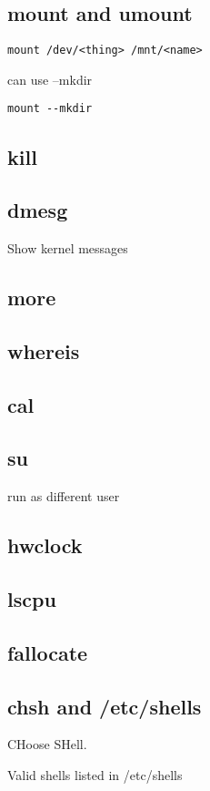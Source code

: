 
\subsection{mount and umount}

\begin{verbatim}
mount /dev/<thing> /mnt/<name>
\end{verbatim}

can use --mkdir
\begin{verbatim}
mount --mkdir
\end{verbatim}

\subsection{kill}

\subsection{dmesg}
Show kernel messages

\subsection{more}

\subsection{whereis}

\subsection{cal}

\subsection{su}

run as different user

\subsection{hwclock}

\subsection{lscpu}

\subsection{fallocate}

\subsection{chsh and /etc/shells}

CHoose SHell.

Valid shells listed in /etc/shells

